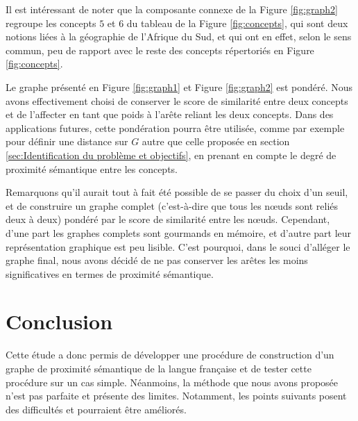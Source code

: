 \documentclass{amsart}
\begin{document}
Il est intéressant de noter que la composante connexe de la Figure \ref{fig:graph2} regroupe les concepts $5$ et $6$ du tableau de la Figure \ref{fig:concepts}, qui sont deux notions liées à la géographie de l'Afrique du Sud, et qui ont en effet, selon le sens commun, peu de rapport avec le reste des concepts répertoriés en Figure \ref{fig:concepts}.

Le graphe présenté en Figure \ref{fig:graph1} et Figure \ref{fig:graph2} est pondéré. Nous avons effectivement choisi de conserver le score de similarité entre deux concepts et de l'affecter en tant que poids à l'arête reliant les deux concepts. Dans des applications futures, cette pondération pourra être utilisée, comme par exemple pour définir une distance sur $G$ autre que celle proposée en section \ref{sec:Identification du problème et objectifs}, en prenant en compte le degré de proximité sémantique entre les concepts.

Remarquons qu'il aurait tout à fait été possible de se passer du choix d'un seuil, et de construire un graphe complet (c'est-à-dire que tous les n\oe{}uds sont reliés deux à deux) pondéré par le score de similarité entre les n\oe{}uds. Cependant, d'une part les graphes complets sont gourmands en mémoire, et d'autre part leur représentation graphique est peu lisible. C'est pourquoi, dans le souci d'alléger le graphe final, nous avons décidé de ne pas conserver les arêtes les moins significatives en termes de proximité sémantique.

\section{Conclusion}

Cette étude a donc permis de développer une procédure de construction d'un graphe de proximité sémantique de la langue française et de tester cette procédure sur un cas simple. Néanmoins, la méthode que nous avons proposée n'est pas parfaite et présente des limites. Notamment, les points suivants posent des difficultés et pourraient être améliorés.
\end{document}
